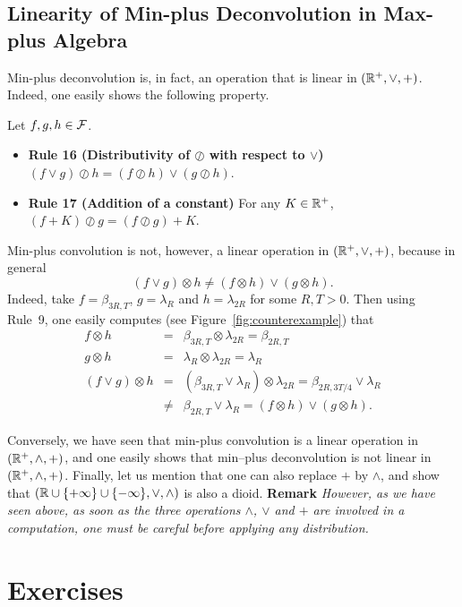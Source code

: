 \subsection{Linearity of Min-plus Deconvolution in Max-plus Algebra}
Min-plus deconvolution is, in fact, an operation that is linear in
$( \mathbb{R}^{+}, \vee, +)$. Indeed, one easily shows the following
property.
\begin{theorem}
Let $f, g, h \in \mathcal F$.
\begin{itemize}
\item{ \textbf{Rule 16 (Distributivity of $\oslash$ with respect to $\vee$)}
$(f \vee g) \oslash h =  (f \oslash h) \vee (g \oslash h)$. }
\item{ \textbf{Rule 17 (Addition of a constant)} For any $K \in \mathbb{R}^{+}$,
$(f + K) \oslash g =  (f \oslash g) + K$. }
\end{itemize}
\end{theorem}
Min-plus convolution is not, however, a linear operation in $( \mathbb{R}^{+}, \vee, +)$, because in general
$$(f \vee g) \otimes h \neq  (f \otimes h) \vee (g \otimes h). $$
Indeed, take $f = \beta_{3R,T}$, $g = \lambda_{R}$ and $h = \lambda_{2R}$ for some $R, T > 0$.
Then using Rule~9, one easily computes (see Figure~\ref{fig:counterexample}) that
\begin{eqnarray*}
f \otimes h & = & \beta_{3R,T} \otimes  \lambda_{2R} = \beta_{2R,T} \\
g \otimes h & = & \lambda_{R} \otimes  \lambda_{2R} = \lambda_{R} \\
(f \vee g) \otimes h & = & ( \beta_{3R,T} \vee \lambda_{R}) \otimes  \lambda_{2R} = \beta_{2R,3T/4} \vee \lambda_{R} \\
            & \neq & \beta_{2R,T} \vee \lambda_{R} = (f \otimes h) \vee (g \otimes h).
\end{eqnarray*}
\begin{figure}[!htbp]
\end{figure}
Conversely, we have seen that min-plus convolution is a linear operation  in $( \mathbb{R}^{+}, \wedge, +)$,
and one easily shows that min--plus deconvolution is not linear in $( \mathbb{R}^{+}, \wedge, +)$.
Finally, let us mention that one can also replace $+$ by $\wedge$,
and show that $( \mathbb{R} \cup \{ +\infty \} \cup \{ -\infty \}, \vee, \wedge ) $ is also a dioid.
\noindent
{\bf Remark} \textit{However, as we have seen above, as soon as the three operations $\wedge$, $\vee$ and $+$ are involved in a
 computation, one must be careful before applying any distribution.}

\section{Exercises}



